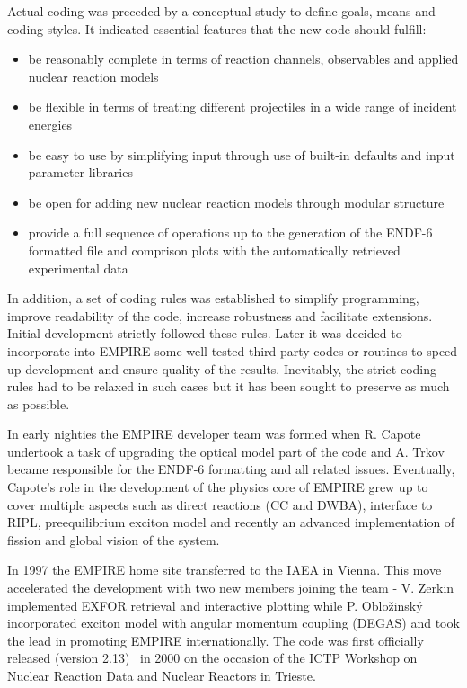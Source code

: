 \documentclass[twocolumn,amsmath,amssymb,10pt,groupedaddress,letter]{revtex4}
\begin{document}
Actual coding was preceded by a conceptual study to define goals, means and coding styles. It indicated essential features that the new code should fulfill:
\begin{itemize}
\item be reasonably complete in terms of reaction channels, observables and applied nuclear reaction models
\item be flexible in terms of treating different projectiles in a  wide range of incident energies
\item be easy to use by simplifying input through use of built-in defaults and input parameter libraries
\item be open for adding new nuclear reaction models through modular structure
\item provide a full sequence of operations  up to the generation of the ENDF-6 formatted file and comprison plots with the automatically retrieved experimental data
\end{itemize}
In addition, a set of coding rules was established to simplify programming, improve readability of the code, increase robustness and facilitate extensions. Initial development strictly followed these rules. Later it was decided to incorporate into EMPIRE some well tested third party codes or routines to speed up development and ensure quality of the results. Inevitably, the strict coding rules had to be relaxed in such cases but it has been sought to preserve as much as possible.

In early nighties the EMPIRE developer team was formed when R. Capote undertook a task of upgrading the optical model part of the code and A. Trkov became responsible for the ENDF-6 formatting and all related issues. Eventually, Capote's role in the development of the physics core of EMPIRE grew up to cover multiple aspects such as direct reactions (CC and DWBA), interface to RIPL, preequilibrium exciton model and recently an advanced implementation of fission and global vision of the system.

In 1997 the EMPIRE home site transferred to the IAEA in Vienna. This move accelerated the development with two new members joining the team - V. Zerkin implemented EXFOR retrieval and interactive plotting while P. Oblo\v zinsk\'y incorporated exciton model with angular momentum coupling (DEGAS) and took the lead in promoting EMPIRE internationally. The code was first officially released (version 2.13)~\cite{EMPIRE:Trieste01} in 2000 on the occasion of the ICTP Workshop on Nuclear Reaction Data and Nuclear Reactors in Trieste.
\end{document}
